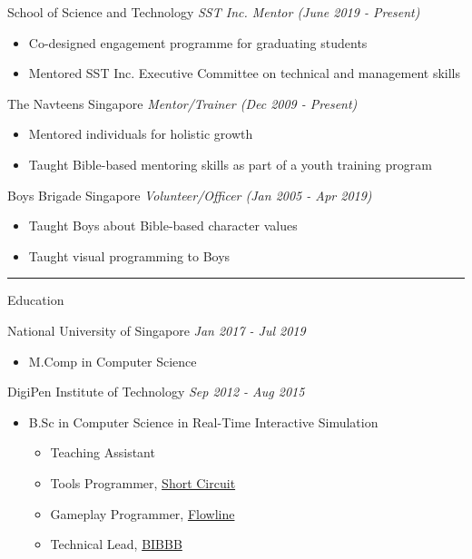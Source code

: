 \documentclass[letterpaper,11pt]{article}
\newcommand{\cvtitle}[1]{\huge\raggedright \textcolor{section_color}{#1}\\}
\newcommand{\cvhead}[1]{\large\raggedright \textcolor{subsection_color}{#1}\\}
\newcommand{\cvlist}[1]{\vspace{-12pt}\small \textcolor{item_color}{\begin{itemize}#1\end{itemize}}}
\newcommand{\cvli}[1]{\vspace{-4pt} \item{#1}}
\newcommand{\cvline}[0]{\noindent\rule{19cm}{0.4pt}}
\newcommand{\link}[2]{\textcolor{link_color}{\href{#1}{#2}}}
\newcommand{\qualifier}[1]{\hfill \textsl{\footnotesize #1}}
\begin{document}
\cvhead{School of Science and Technology \qualifier{SST Inc. Mentor (June 2019 - Present)}}
\cvlist{
    \cvli{Co-designed engagement programme for graduating students}
    \cvli{Mentored SST Inc. Executive Committee on technical and management skills}
}

\cvhead{The Navteens Singapore \qualifier{Mentor/Trainer (Dec 2009 - Present)}}
\cvlist{
    \cvli{Mentored individuals for holistic growth}
    \cvli{Taught Bible-based mentoring skills as part of a youth training program}
}

\cvhead{Boys Brigade Singapore \qualifier{Volunteer/Officer (Jan 2005 - Apr 2019)}}
\cvlist{
    \cvli{Taught Boys about Bible-based character values}
    \cvli{Taught visual programming to Boys}
}

\vspace{-12pt}

\cvline

\cvtitle{Education}
\cvhead{National University of Singapore \qualifier{Jan 2017 - Jul 2019}}
\cvlist{
    \cvli{
        \cvhead{M.Comp in Computer Science}
    }
}

\cvhead{DigiPen Institute of Technology \qualifier{Sep 2012 - Aug 2015}}
\cvlist{
    \cvli{
        \cvhead{B.Sc in Computer Science in Real-Time Interactive Simulation}
        \cvlist{
            \cvli{Teaching Assistant}
            \cvli{Tools Programmer, \link{http://games.digipen.edu/games/shortcircuit}{Short Circuit}}
            \cvli{Gameplay Programmer, \link{http://games.digipen.edu/games/flowline}{Flowline}}
            \cvli{Technical Lead, \link{http://games.digipen.edu/games/bibbb}{BIBBB}}
        }
    }
}
\end{document}
